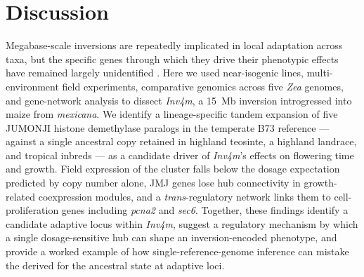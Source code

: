 \documentclass[9pt,twocolumn,twoside]{rilabRxiv}
\newcommand{\mex}{\textit{mexicana}\xspace}
\newcommand{\invfour}{\textit{Inv4m}\xspace}
\begin{document}
\section{Discussion}
Megabase-scale inversions are repeatedly implicated in local adaptation across taxa, but the specific genes through which they drive their phenotypic effects have remained largely unidentified \citep{wellenreuther2018, kirkpatrick2006, kirkpatrick2010}.
Here we used near-isogenic lines, multi-environment field experiments, comparative genomics across five \textit{Zea} genomes, and gene-network analysis to dissect \invfour, a 15~Mb inversion introgressed into maize from \mex.
We identify a lineage-specific tandem expansion of five JUMONJI histone demethylase paralogs in the temperate B73 reference --- against a single ancestral copy retained in highland teosinte, a highland landrace, and tropical inbreds --- as a candidate driver of \invfour's effects on flowering time and growth.
Field expression of the cluster falls below the dosage expectation predicted by copy number alone, JMJ genes lose hub connectivity in growth-related coexpression modules, and a \textit{trans}-regulatory network links them to cell-proliferation genes including \textit{pcna2} and \textit{sec6}.
Together, these findings identify a candidate adaptive locus within \invfour, suggest a regulatory mechanism by which a single dosage-sensitive hub can shape an inversion-encoded phenotype, and provide a worked example of how single-reference-genome inference can mistake the derived for the ancestral state at adaptive loci.
\end{document}
